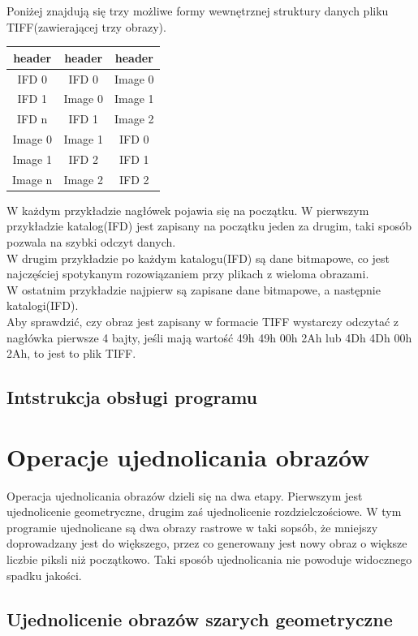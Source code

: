 \documentclass[final,a4paper,openany,12pt]{mwbk}
\begin{document}
Poniżej znajdują się trzy możliwe formy wewnętrznej struktury danych pliku TIFF(zawierającej trzy obrazy).
\begin{center}
	\begin{tabular}{|c|c|c|}
		\hline
		header & header & header\\
		\hline
		IFD 0 & IFD 0 & Image 0\\
		\hline
		IFD 1 & Image 0 & Image 1\\
		\hline
		IFD n & IFD 1 & Image 2\\
		\hline
		Image 0 & Image 1 & IFD 0\\
		\hline
		Image 1 & IFD 2 & IFD 1\\
		\hline
		Image n & Image 2 & IFD 2\\
		\hline
	\end{tabular}
\end{center}
W każdym przykładzie nagłówek pojawia się na początku.
W pierwszym przykładzie katalog(IFD) jest zapisany na początku jeden za drugim, taki sposób pozwala na szybki odczyt danych.\\
W drugim przykładzie po każdym katalogu(IFD) są dane bitmapowe, co jest najczęściej spotykanym rozowiązaniem przy plikach z wieloma obrazami.\\
W ostatnim przykładzie najpierw są zapisane dane bitmapowe, a następnie katalogi(IFD).\\
Aby sprawdzić, czy obraz jest zapisany w formacie TIFF wystarczy odczytać z nagłówka pierwsze 4 bajty, jeśli mają wartość 49h 49h 00h 2Ah lub 4Dh 4Dh 00h 2Ah, to jest to plik TIFF.

\section {Intstrukcja obsługi programu}



\chapter{Operacje ujednolicania obrazów}
Operacja ujednolicania obrazów dzieli się na dwa etapy. Pierwszym jest ujednolicenie geometryczne, drugim zaś ujednolicenie rozdzielczościowe. W tym programie ujednolicane są dwa obrazy rastrowe w taki sopsób, że mniejszy doprowadzany jest do większego, przez co generowany jest nowy obraz o większe liczbie piksli niż początkowo. Taki sposób ujednolicania nie powoduje widocznego spadku jakości.
\newpage

\section{Ujednolicenie obrazów szarych geometryczne}
\end{document}
